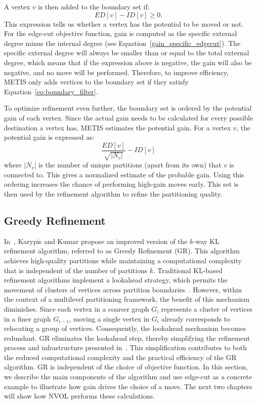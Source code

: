 A vertex $v$ is then added to the boundary set if:
\begin{equation} \label{eq:boundary_filter}
	ED[v] - ID[v] \geq 0.
\end{equation}
This expression tells us whether a vertex has the potential to be moved or not. For the edge-cut objective function, gain is computed as the specific external degree minus the internal degree (see Equation~\ref{gain_specific_edgecut}). The specific external degree will always be smaller than or equal to the total external degree, which means that if the expression above is negative, the gain will also be negative, and no move will be performed. Therefore, to improve efficiency, METIS only adds vertices to the boundary set if they satisfy Equation~\ref{eq:boundary_filter}.

To optimize refinement even further, the boundary set is ordered by the potential gain of each vertex. Since the actual gain needs to be calculated for every possible destination a vertex has, METIS estimates the potential gain. For a vertex $v$, the potential gain is expressed as:
\[
\frac{ED[v]}{\sqrt{|N_v|}} - ID[v]
\]
where $|N_v|$ is the number of unique partitions (apart from its own) that $v$ is connected to. This gives a normalized estimate of the probable gain. Using this ordering increases the chance of performing high-gain moves early. This set is then used by the refinement algorithm to refine the partitioning quality. 

\subsection{Greedy Refinement} \label{sec:greedy_refinement}
In~\cite{karypis_multilevelk-way_1998}, Karypis and Kumar propose an improved version of the $k$-way KL refinement algorithm, referred to as Greedy Refinement (GR). This algorithm achieves high-quality partitions while maintaining a computational complexity that is independent of the number of partitions $k$. Traditional KL-based refinement algorithms implement a lookahead strategy, which permits the movement of clusters of vertices across partition boundaries~\cite{karypis_multilevelk-way_1998}. However, within the context of a multilevel partitioning framework, the benefit of this mechanism diminishes. Since each vertex in a coarser graph $G_i$ represents a cluster of vertices in a finer graph $G_{i-1}$, moving a single vertex in $G_i$ already corresponds to relocating a group of vertices. Consequently, the lookahead mechanism becomes redundant. GR eliminates the lookahead step, thereby simplifying the refinement process and infrastructure presented in~\cite{hendrickson_improved_1995}. This simplification contributes to both the reduced computational complexity and the practical efficiency of the GR algorithm. GR is independent of the choice of objective function. In this section, we describe the main components of the algorithm and use edge-cut as a concrete example to illustrate how gain drives the choice of a move. The next two chapters will show how NVOL performs these calculations. 

